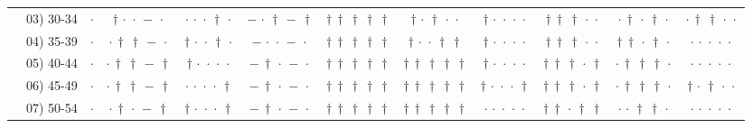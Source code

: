{\begin{longtable}[t]{llcccccccccc}
 & 03) 30-34 & $\cdot$ & ${\dagger}\,{\cdot}\,{\cdot}\,{-}\,{\cdot}$ & ${\cdot}\,{\cdot}\,{\cdot}\,{\dagger}\,{\cdot}$ & ${-}\,{\cdot}\,{\dagger}\,{-}\,{\dagger}$ & ${\dagger}\,{\dagger}\,{\dagger}\,{\dagger}\,{\dagger}$ & ${\dagger}\,{\cdot}\,{\dagger}\,{\cdot}\,{\cdot}$ & ${\dagger}\,{\cdot}\,{\cdot}\,{\cdot}\,{\cdot}$ & ${\dagger}\,{\dagger}\,{\dagger}\,{\cdot}\,{\cdot}$ & ${\cdot}\,{\dagger}\,{\cdot}\,{\dagger}\,{\cdot}$ & ${\cdot}\,{\dagger}\,{\dagger}\,{\cdot}\,{\cdot}$ \\
 & 04) 35-39 & $\cdot$ & ${\cdot}\,{\dagger}\,{\dagger}\,{-}\,{\cdot}$ & ${\dagger}\,{\cdot}\,{\cdot}\,{\dagger}\,{\cdot}$ & ${-}\,{\cdot}\,{\cdot}\,{-}\,{\cdot}$ & ${\dagger}\,{\dagger}\,{\dagger}\,{\dagger}\,{\dagger}$ & ${\dagger}\,{\cdot}\,{\cdot}\,{\dagger}\,{\dagger}$ & ${\dagger}\,{\cdot}\,{\cdot}\,{\cdot}\,{\cdot}$ & ${\dagger}\,{\dagger}\,{\dagger}\,{\cdot}\,{\cdot}$ & ${\dagger}\,{\dagger}\,{\cdot}\,{\dagger}\,{\cdot}$ & ${\cdot}\,{\cdot}\,{\cdot}\,{\cdot}\,{\cdot}$ \\
 & 05) 40-44 & $\cdot$ & ${\cdot}\,{\dagger}\,{\dagger}\,{-}\,{\dagger}$ & ${\dagger}\,{\cdot}\,{\cdot}\,{\cdot}\,{\cdot}$ & ${-}\,{\dagger}\,{\cdot}\,{-}\,{\cdot}$ & ${\dagger}\,{\dagger}\,{\dagger}\,{\dagger}\,{\dagger}$ & ${\dagger}\,{\dagger}\,{\dagger}\,{\dagger}\,{\dagger}$ & ${\dagger}\,{\cdot}\,{\cdot}\,{\cdot}\,{\cdot}$ & ${\dagger}\,{\dagger}\,{\dagger}\,{\cdot}\,{\dagger}$ & ${\cdot}\,{\dagger}\,{\dagger}\,{\dagger}\,{\cdot}$ & ${\cdot}\,{\cdot}\,{\cdot}\,{\cdot}\,{\cdot}$ \\
 & 06) 45-49 & $\cdot$ & ${\cdot}\,{\dagger}\,{\dagger}\,{-}\,{\dagger}$ & ${\cdot}\,{\cdot}\,{\cdot}\,{\cdot}\,{\dagger}$ & ${-}\,{\dagger}\,{\cdot}\,{-}\,{\cdot}$ & ${\dagger}\,{\dagger}\,{\dagger}\,{\dagger}\,{\dagger}$ & ${\dagger}\,{\dagger}\,{\dagger}\,{\dagger}\,{\dagger}$ & ${\dagger}\,{\cdot}\,{\cdot}\,{\cdot}\,{\dagger}$ & ${\dagger}\,{\dagger}\,{\dagger}\,{\cdot}\,{\dagger}$ & ${\cdot}\,{\dagger}\,{\dagger}\,{\dagger}\,{\cdot}$ & ${\dagger}\,{\cdot}\,{\dagger}\,{\cdot}\,{\cdot}$ \\
 & 07) 50-54 & $\cdot$ & ${\cdot}\,{\dagger}\,{\cdot}\,{-}\,{\dagger}$ & ${\dagger}\,{\cdot}\,{\cdot}\,{\cdot}\,{\dagger}$ & ${-}\,{\dagger}\,{\cdot}\,{-}\,{\cdot}$ & ${\dagger}\,{\dagger}\,{\dagger}\,{\dagger}\,{\dagger}$ & ${\dagger}\,{\dagger}\,{\dagger}\,{\dagger}\,{\dagger}$ & ${\cdot}\,{\cdot}\,{\cdot}\,{\cdot}\,{\cdot}$ & ${\dagger}\,{\dagger}\,{\cdot}\,{\dagger}\,{\dagger}$ & ${\cdot}\,{\cdot}\,{\dagger}\,{\dagger}\,{\cdot}$ & ${\cdot}\,{\cdot}\,{\cdot}\,{\cdot}\,{\cdot}$ \\

\end{longtable}}

